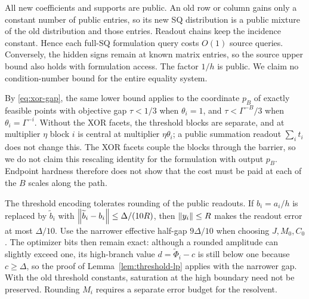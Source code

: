 All new coefficients and supports are public.  An old row or column
gains only a constant number of public entries, so its new SQ
distribution is a public mixture of the old distribution and those
entries.  Readout chains keep the incidence constant.  Hence each full-SQ
formulation query costs $O(1)$ source queries.  Conversely, the hidden signs remain at known matrix
entries, so the source upper bound also holds with formulation access.
The factor $1/h$ is public.  We claim no condition-number bound for the
entire equality system.

By \eqref{eq:xor-gap}, the same lower bound applies to the coordinate
$p_B$ of exactly feasible points with objective gap $\tau<1/3$ when
$\theta_i=1$, and $\tau<\Gamma^{-B}/3$ when $\theta_i=\Gamma^{-i}$.
Without the XOR facets, the threshold blocks are separate, and at
multiplier $\eta$ block $i$ is central at multiplier $\eta\theta_i$; a
public summation readout $\sum_i t_i$ does not change this.  The XOR
facets couple the blocks through the barrier, so we do not claim this
rescaling identity for the formulation with output $p_B$.  Endpoint hardness
therefore does not show that the cost must be paid at each of the $B$
scales along the path.

The threshold encoding tolerates rounding of the public readouts.  If
$b_i=a_i/h$ is replaced by $\widetilde b_i$ with
$\left\lVert\widetilde b_i-b_i\right\rVert\leq\Delta/(10R)$, then
$\left\lVert y_i\right\rVert\leq R$ makes the readout error at most $\Delta/10$.
Use the narrower effective half-gap $9\Delta/10$ when choosing $J,M_0,C_0$.
The optimizer bits then remain exact: although a rounded amplitude can
slightly exceed one, its high-branch value $d=\widetilde\Phi_i-c$ is
still below one because $c\geq\Delta$, so the proof of
Lemma~\ref{lem:threshold-lp} applies with the narrower gap.
With the old threshold constants, saturation at the high boundary need
not be preserved.  Rounding $M_i$ requires a separate error budget for
the resolvent.

